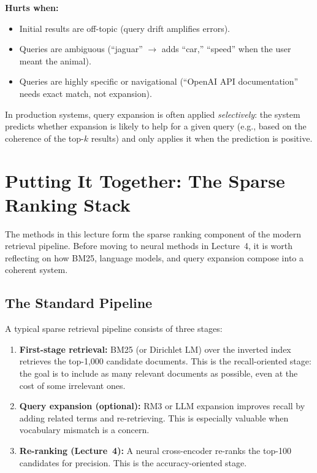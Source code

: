 \documentclass[11pt,a4paper]{article}
\theoremstyle{definition}
\theoremstyle{plain}
\begin{document}
\textbf{Hurts when:}
\begin{itemize}
    \item Initial results are off-topic (query drift amplifies errors).
    \item Queries are ambiguous (``jaguar'' $\to$ adds ``car,'' ``speed'' when the user meant the animal).
    \item Queries are highly specific or navigational (``OpenAI API documentation'' needs exact match, not expansion).
\end{itemize}

In production systems, query expansion is often applied \emph{selectively}: the system predicts whether expansion is likely to help for a given query (e.g., based on the coherence of the top-$k$ results) and only applies it when the prediction is positive.


\section{Putting It Together: The Sparse Ranking Stack}
\label{sec:stack}

The methods in this lecture form the sparse ranking component of the modern retrieval pipeline. Before moving to neural methods in Lecture~4, it is worth reflecting on how BM25, language models, and query expansion compose into a coherent system.

\subsection{The Standard Pipeline}

A typical sparse retrieval pipeline consists of three stages:
\begin{enumerate}
    \item \textbf{First-stage retrieval:} BM25 (or Dirichlet LM) over the inverted index retrieves the top-1{,}000 candidate documents. This is the recall-oriented stage: the goal is to include as many relevant documents as possible, even at the cost of some irrelevant ones.
    
    \item \textbf{Query expansion (optional):} RM3 or LLM expansion improves recall by adding related terms and re-retrieving. This is especially valuable when vocabulary mismatch is a concern.
    
    \item \textbf{Re-ranking (Lecture~4):} A neural cross-encoder re-ranks the top-100 candidates for precision. This is the accuracy-oriented stage.
\end{enumerate}
\end{document}
